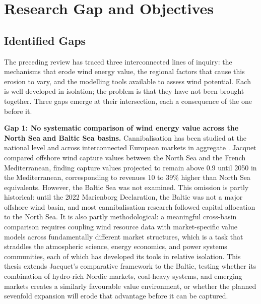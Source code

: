 
\section{Research Gap and Objectives}\label{sec:research_gap}

\subsection{Identified Gaps}\label{sec:gaps}

The preceding review has traced three interconnected lines of inquiry: the mechanisms that erode wind energy value, the regional factors that cause this erosion to vary, and the modelling tools available to assess wind potential. Each is well developed in isolation; the problem is that they have not been brought together. Three gaps emerge at their intersection, each a consequence of the one before it.

\vspace{4pt}

\textbf{Gap 1: No systematic comparison of wind energy value across the North Sea and Baltic Sea basins.} Cannibalisation has been studied at the national level \cite{Hirth2013, Brown2021, LopezProl2024} and across interconnected European markets in aggregate \cite{Stiewe2025, Cevik2022}. Jacquet \cite{Jacquet2024} compared offshore wind capture values between the North Sea and the French Mediterranean, finding capture values projected to remain above 0.9 until 2050 in the Mediterranean, corresponding to revenues 10 to 39\% higher than North Sea equivalents. However, the Baltic Sea was not examined. This omission is partly historical: until the 2022 Marienborg Declaration, the Baltic was not a major offshore wind basin, and most cannibalisation research followed capital allocation to the North Sea. It is also partly methodological: a meaningful cross-basin comparison requires coupling wind resource data with market-specific value models across fundamentally different market structures, which is a task that straddles the atmospheric science, energy economics, and power systems communities, each of which has developed its tools in relative isolation. This thesis extends Jacquet's comparative framework to the Baltic, testing whether its combination of hydro-rich Nordic markets, coal-heavy systems, and emerging markets creates a similarly favourable value environment, or whether the planned sevenfold expansion will erode that advantage before it can be captured.

\vspace{4pt}

